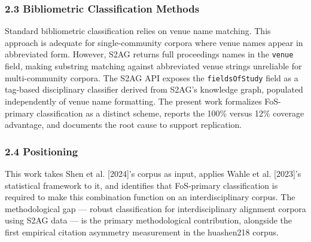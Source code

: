 \subsubsection{2.3 Bibliometric Classification Methods}

Standard bibliometric classification relies on venue name matching. This approach is adequate for single-community corpora where venue names appear in abbreviated form. However, S2AG returns full proceedings names in the \texttt{venue} field, making substring matching against abbreviated venue strings unreliable for multi-community corpora. The S2AG API \citep{Wade2022S2AG} exposes the \texttt{fieldsOfStudy} field as a tag-based disciplinary classifier derived from S2AG's knowledge graph, populated independently of venue name formatting. The present work formalizes FoS-primary classification as a distinct scheme, reports the 100\% versus 12\% coverage advantage, and documents the root cause to support replication.

\subsubsection{2.4 Positioning}

This work takes Shen et al. [2024]'s corpus as input, applies Wahle et al. [2023]'s statistical framework to it, and identifies that FoS-primary classification is required to make this combination function on an interdisciplinary corpus. The methodological gap --- robust classification for interdisciplinary alignment corpora using S2AG data --- is the primary methodological contribution, alongside the first empirical citation asymmetry measurement in the huashen218 corpus.


